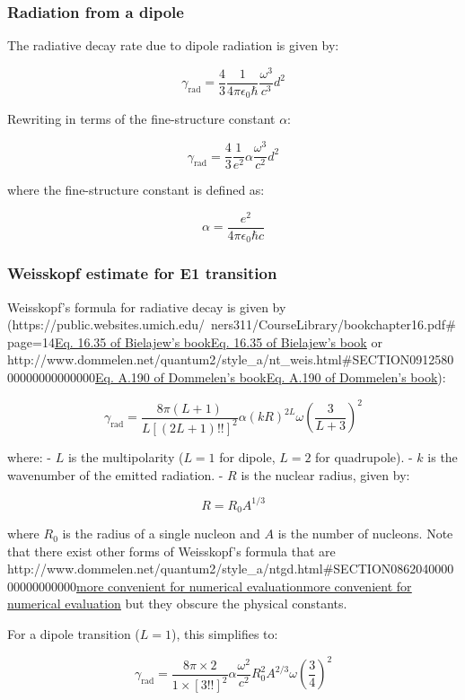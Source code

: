 \documentclass[
]{article}
\let\oldhref\href
\renewcommand{\href}[2]{\ifx#1\urlprefix\oldhref{#1}{#2}\else\uline{\oldhref{#1}{#2}}\fi}
\renewcommand{\[}{\begin{equation}}
\renewcommand{\]}{\end{equation}}
\begin{document}
\subsubsection{Radiation from a dipole}\label{radiation-from-a-dipole}

The radiative decay rate due to dipole radiation is given by:

\[
\gamma_{\text{rad}} = \frac{4}{3} \frac{1}{4 \pi \epsilon_0 \hbar} \frac{\omega^3}{c^3} d^2
\]

Rewriting in terms of the fine-structure constant \(\alpha\):

\[
\gamma_{\text{rad}} = \frac{4}{3} \frac{1}{e^2} \alpha \frac{\omega^3}{c^2} d^2
\]

where the fine-structure constant is defined as:

\[
\alpha = \frac{e^2}{4\pi \epsilon_0 \hbar c}
\]

\subsubsection{Weisskopf estimate for E1
transition}\label{weisskopf-estimate-for-e1-transition}

Weisskopf's formula for radiative decay is given by
(\href{https://public.websites.umich.edu/~ners311/CourseLibrary/bookchapter16.pdf\#page=14}{Eq.
16.35 of Bielajew's book} or
\href{http://www.dommelen.net/quantum2/style_a/nt_weis.html\#SECTION091258000000000000000}{Eq.
A.190 of Dommelen's book}):

\[
\gamma_{\text{rad}} = \frac{8\pi (L+1)}{L \left[(2L+1)!!\right]^2} \alpha (kR)^{2L} \omega \left( \frac{3}{L+3} \right)^2
\]

where: - \(L\) is the multipolarity (\(L=1\) for dipole, \(L=2\) for
quadrupole). - \(k\) is the wavenumber of the emitted radiation. - \(R\)
is the nuclear radius, given by:

\[
R = R_0 A^{1/3}
\]

where \(R_0\) is the radius of a single nucleon and \(A\) is the number
of nucleons. Note that there exist other forms of Weisskopf's formula
that are
\href{http://www.dommelen.net/quantum2/style_a/ntgd.html\#SECTION086204000000000000000}{more
convenient for numerical evaluation} but they obscure the physical
constants.

For a dipole transition (\(L=1\)), this simplifies to:

\[
\gamma_{\text{rad}} = \frac{8\pi \times 2}{1 \times [3!!]^2} \alpha \frac{\omega^2}{c^2} R_0^2 A^{2/3} \omega \left(\frac{3}{4} \right)^2
\]
\end{document}
